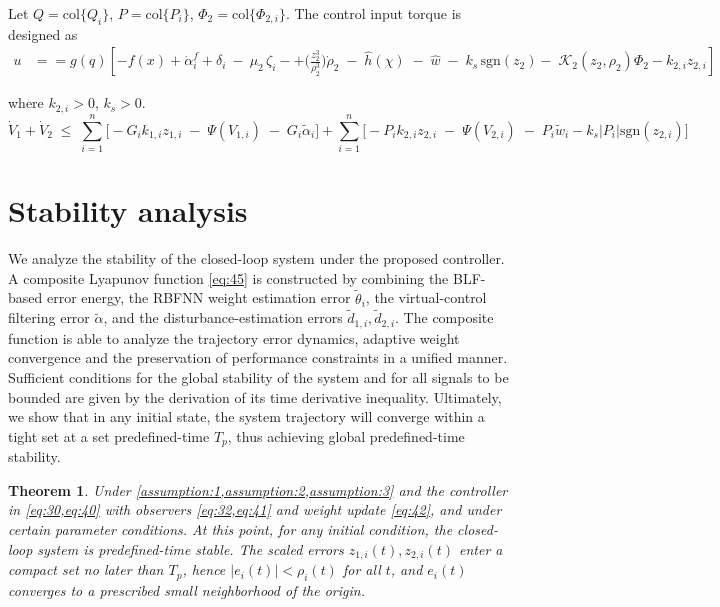 \documentclass[pdflatex,sn-mathphys-num]{sn-jnl}%
\theoremstyle{thmstyleone}%
\newtheorem{theorem}{Theorem}%
\theoremstyle{thmstyletwo}%
\theoremstyle{thmstylethree}%
\begin{document}
Let $Q=\mathrm{col}\{Q_{i}\}$,
$P=\mathrm{col}\{P_i\}$,
$\Phi_2=\mathrm{col}\{\Phi_{2,i}\}$. The control input torque is designed as
\begin{equation}\label{eq:tau-cmd}
\begin{aligned}
u &==g(q)\left[-f(x)+\dot\alpha_i^{f}+\delta_i\ -\ \mu_2\,\zeta_i-+\Big(\tfrac{z_{2}^{3}}{\rho_{2}^{3}}\Big)\dot\rho_{2}
\;-\;\hat{h}(\chi)
\;-\;\hat w
\;-\;k_s\,\mathrm{sgn}(z_{2})-\;\mathcal{K}_{2}(z_{2},\rho_{2}) \Phi_{2}-k_{2,i}z_{2,i}\right]
\end{aligned}
\end{equation}


where $k_{2,i}>0$,
$k_s>0$.
\[
\dot V_1+\dot V_2
\;\le\;
\sum_{i=1}^n \Big[
-G_i k_{1,i}z_{1,i}\;-\;\Psi(V_{1,i})\;-\;G_i\tilde\alpha_i]
+\sum_{i=1}^n \Big[
-P_i k_{2,i}z_{2,i}\;-\;\Psi(V_{2,i})\;-\;P_i\tilde{w}_i- k_s |P_i|\mathrm{sgn}(z_{2,i})\Big]
\]



\section{Stability analysis}

 We analyze the stability of the closed-loop system under the proposed controller.  A composite Lyapunov function \cref{eq:45} is constructed by combining the BLF-based error energy, the RBFNN weight estimation error $\tilde \theta_{i}$, the virtual-control filtering error $\tilde\alpha$, and the disturbance-estimation errors $\tilde d_{1,i},\tilde d_{2,i}$. The composite function is able to analyze the trajectory error dynamics, adaptive weight convergence and the preservation of performance constraints in a unified manner. Sufficient conditions for the global stability of the system and for all signals to be bounded are given by the derivation of its time derivative inequality. Ultimately, we show that in any initial state, the system trajectory will converge within a tight set at a set predefined-time $T_p$, thus achieving global predefined-time stability.

 \begin{theorem}
	Under \cref{assumption:1,assumption:2,assumption:3} and the controller in \cref{eq:30,eq:40} with observers \cref{eq:32,eq:41} and weight update \cref{eq:42}, and under certain parameter conditions. At this point, for any initial condition, the closed-loop system is predefined-time stable. The scaled errors $z_{1,i}(t),z_{2,i}(t)$ enter a compact set no later than $T_p$, hence $|e_{i}(t)|<\rho_{i}(t)$ for all $t$, and $e_i(t)$ converges to a prescribed small neighborhood of the origin.
\end{theorem}
\end{document}
